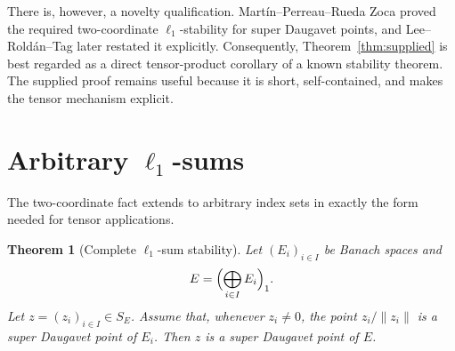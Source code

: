 \documentclass[11pt]{article}
\newtheorem{theorem}{Theorem}[section]
\theoremstyle{definition}
\begin{document}
There is, however, a novelty qualification.  Martín--Perreau--Rueda Zoca
proved the required two-coordinate $\ell_1$-stability for super Daugavet
points, and Lee--Roldán--Tag later restated it explicitly.  Consequently,
Theorem~\ref{thm:supplied} is best regarded as a direct tensor-product
corollary of a known stability theorem.  The supplied proof remains useful
because it is short, self-contained, and makes the tensor mechanism explicit.

\section{Arbitrary $\ell_1$-sums}\label{sec:l1}

The two-coordinate fact extends to arbitrary index sets in exactly the form
needed for tensor applications.

\begin{theorem}[Complete $\ell_1$-sum stability]\label{thm:l1sum}
Let $(E_i)_{i\in I}$ be Banach spaces and
\[
       E=\Bigl(\bigoplus_{i\in I}E_i\Bigr)_1.
\]
Let $z=(z_i)_{i\in I}\in S_E$.  Assume that, whenever $z_i\ne0$, the point
$z_i/\|z_i\|$ is a super Daugavet point of $E_i$.  Then $z$ is a super
Daugavet point of $E$.
\end{theorem}
\end{document}
